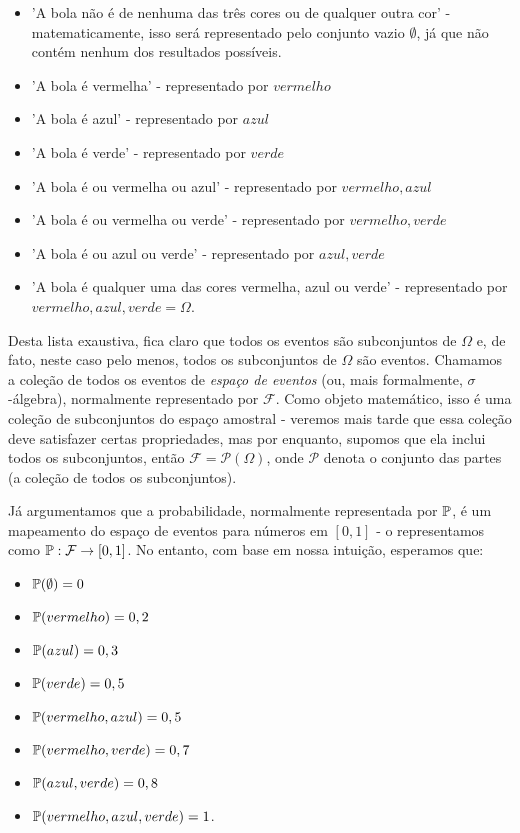 \begin{itemize}
\item 'A bola não é de nenhuma das três cores ou de qualquer outra cor' - matematicamente, isso será representado pelo conjunto vazio $\emptyset$, já que não contém nenhum dos resultados possíveis.
\item 'A bola é vermelha' - representado por ${vermelho}$
\item 'A bola é azul' - representado por ${azul}$
\item 'A bola é verde' - representado por ${verde}$
\item 'A bola é ou vermelha ou azul' - representado por ${vermelho, azul}$
\item 'A bola é ou vermelha ou verde' - representado por ${vermelho, verde}$
\item 'A bola é ou azul ou verde' - representado por ${azul, verde}$
\item 'A bola é qualquer uma das cores vermelha, azul ou verde' - representado por ${vermelho, azul, verde}=\Omega$.
\end{itemize}

Desta lista exaustiva, fica claro que todos os eventos são subconjuntos de $\Omega$ e, de fato, neste caso pelo menos, todos os subconjuntos de $\Omega$ são eventos. Chamamos a coleção de todos os eventos de \emph{espaço de eventos} (ou, mais formalmente, $\sigma$-álgebra), normalmente representado por $\mathcal{F}$. Como objeto matemático, isso é uma coleção de subconjuntos do espaço amostral - veremos mais tarde que essa coleção deve satisfazer certas propriedades, mas por enquanto, supomos que ela inclui todos os subconjuntos, então $\mathcal{F}= \mathcal{P}(\Omega)$, onde $\mathcal{P}$ denota o conjunto das partes (a coleção de todos os subconjuntos).

Já argumentamos que a probabilidade, normalmente representada por $\mathbb{P}$, é um mapeamento do espaço de eventos para números em $[0,1]$ - o representamos como $\mathbb{P}:\mathcal{F}\to[0,1]$. No entanto, com base em nossa intuição, esperamos que:

\begin{itemize}
\item $\mathbb{P}(\emptyset)=0$
\item $\mathbb{P}({vermelho})=0,2$
\item $\mathbb{P}({azul})=0,3$
\item $\mathbb{P}({verde})=0,5$
\item $\mathbb{P}({vermelho, azul})=0,5$
\item $\mathbb{P}({vermelho, verde})=0,7$
\item $\mathbb{P}({azul, verde})=0,8$
\item $\mathbb{P}({vermelho, azul, verde})=1$.
\end{itemize}

